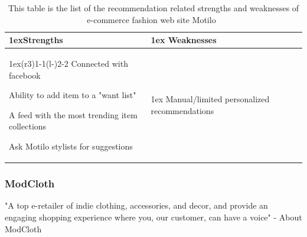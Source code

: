     \begin{table}[H]
    \centering
    \begin{tabularx}{\linewidth}{>{\parskip1ex}X@{\kern4\tabcolsep}>{\parskip1ex}X}
        \toprule
        \hfil\bfseries Strengths
        &
        \hfil\bfseries Weaknesses
            \\\cmidrule(r{3\tabcolsep}){1-1}\cmidrule(l{-\tabcolsep}){2-2}
            Connected with facebook \par
            Ability to add item to a "want list" \par
            A feed with the most trending item collections \par
            Ask Motilo stylists for suggestions \par
            &
            Manual/limited personalized recommendations \par
            \\\bottomrule
            \end{tabularx}
            \caption[Recommendation related strengths and weaknesses of Motilo~\cite{motilo}]{This table is the list of the recommendation related strengths and weaknesses of e-commerce fashion web site Motilo~\cite{motilo}}
            \label{table:ecommenreceMotilo}
        \end{table}


\subsubsection{ModCloth} %
\label{par:modcloth}
    "A top e-retailer of indie clothing, accessories, and decor, and provide an engaging shopping experience where you, our customer, can have a voice" - About ModCloth~\cite{modcloth}

